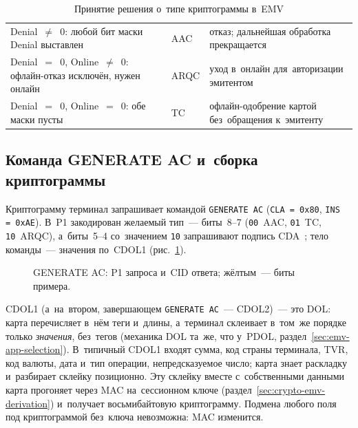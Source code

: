 \begin{table}[!ht]
  \caption{Принятие решения о~типе криптограммы в~EMV}\label{tab:emv-cryptogram-decision}
  \begingroup
  \tablesetup
  \begin{tabularx}{\textwidth}{@{}P{0.38\textwidth} B{0.14\textwidth} Y@{}}
    \toprule
    \headrow
     &  &  \\
    \midrule
    Denial~$\neq$~0: любой бит маски Denial выставлен &
    AAC & отказ; дальнейшая обработка прекращается \\
    \rowsep
    Denial~$=$~0, Online~$\neq$~0: офлайн-отказ исключён, нужен онлайн &
    ARQC & уход в~онлайн для~авторизации эмитентом \\
    \rowsep
    Denial~$=$~0, Online~$=$~0: обе маски пусты &
    TC & офлайн-одобрение картой без~обращения к~эмитенту \\
    \bottomrule
  \end{tabularx}\par
  \endgroup
\end{table}

\subsection*{Команда GENERATE AC и~сборка криптограммы}\label{sec:emv-generate-ac}

Криптограмму терминал запрашивает командой \texttt{GENERATE AC}
(\texttt{CLA\,=\,0x80}, \texttt{INS\,=\,0xAE}). В~P1 закодирован желаемый
тип~--- биты~8--7 (\texttt{00}~AAC, \texttt{01}~TC, \texttt{10}~ARQC), а~биты~5--4
со~значением \texttt{10} запрашивают подпись CDA~\cite{emvco-book3}; тело команды~--- значения по~CDOL1
(рис.~\ref{fig:cid-anatomy}).

\begin{figure}[tbp]
  \centering
  \caption{GENERATE AC: P1 запроса и~CID ответа; жёлтым~--- биты примера.}\label{fig:cid-anatomy}
\end{figure}

CDOL1 (а~на~втором, завершающем \texttt{GENERATE AC}~--- CDOL2)~--- это DOL: карта перечисляет
в~нём теги и~длины, а~терминал склеивает в~том~же порядке только \emph{значения},
без~тегов (механика DOL та~же, что у~PDOL,
раздел~\ref{sec:emv-app-selection}). В~типичный CDOL1 входят сумма, код страны
терминала, TVR, код валюты, дата и~тип операции, непредсказуемое число; карта
знает раскладку и~разбирает склейку позиционно. Эту склейку вместе
с~собственными данными карта прогоняет через MAC на~сессионном ключе
(раздел~\ref{sec:crypto-emv-derivation}) и~получает восьмибайтовую криптограмму.
Подмена любого поля под криптограммой без~ключа невозможна: MAC изменится.

